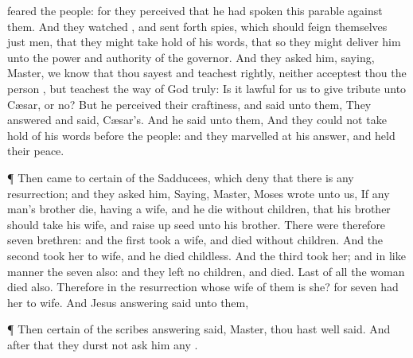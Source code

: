 {feared the
people:
for they
perceived
that he had
spoken
this
parable
against
them.
And they
watched
{}, and sent
forth
spies, which should
feign
themselves just
men,
that they might take
hold of
his
words, that
so they might
deliver
him
unto the
power
and
authority of the
governor.
And they
asked
him,
saying,
Master, we
know
that thou
sayest
and
teachest
rightly,
neither acceptest
thou the
person
{},
but
teachest the
way of
God
truly:
Is it
lawful for
us to
give
tribute unto
Cæsar,
or
no?
But he
perceived
their
craftiness, and
said
unto
them,
{}
 They
answered
and
said,
Cæsar’s.
And he
said unto
them,
{}
And they
could
not take hold
of
his
words
before the
people:
and they
marvelled
at
his
answer, and held their
peace.
\par }{\PP {}¶
Then came
to
{}
certain of the
Sadducees,
which deny
that there
is any
resurrection; and they
asked
him,
Saying,
Master,
Moses
wrote unto
us,
If any
man’s
brother
die,
having a
wife,
and
he
die without
children,
that
his
brother should
take his
wife,
and raise
up
seed unto
his
brother.
There
were
therefore
seven
brethren:
and the
first
took a
wife, and
died without
children.
And the
second
took her to
wife,
and
he
died
childless.
And the
third
took her;
and in like
manner the
seven
also: and they
left
no
children,
and
died.
Last of
all the
woman
died
also.
Therefore
in the
resurrection
whose
wife of
them is
she?
for
seven
had
her to
wife.
And
Jesus
answering
said unto
them,
{}
\par }{\PP {}¶
Then
certain of the
scribes
answering
said,
Master, thou
hast
well
said.
And after
that they
durst
not
ask
him
any
{}.
}

